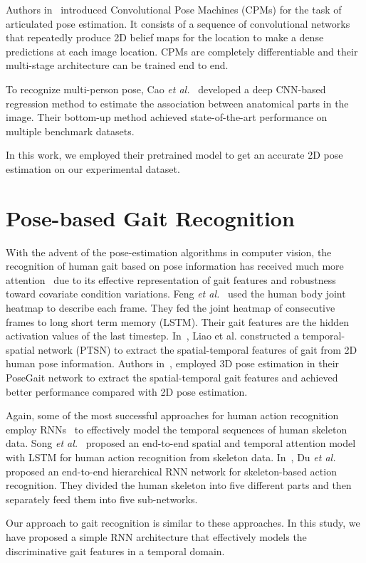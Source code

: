 Authors in~\cite{Wei_16} introduced Convolutional Pose Machines (CPMs) for the task of articulated pose estimation. It consists of a sequence of convolutional networks that repeatedly produce 2D belief maps for the location to make a dense predictions at each image location. CPMs are completely differentiable and their multi-stage architecture can be trained end to end. 

To recognize multi-person pose, Cao \textit{et al.}~\cite{Cao_19} developed a deep CNN-based regression method to estimate the association between anatomical parts in the image. Their bottom-up method achieved state-of-the-art performance on multiple benchmark datasets. 

In this work, we employed their pretrained model to get an accurate 2D pose estimation on our experimental dataset.



\section{Pose-based Gait Recognition} \label{sec:pose_based_gait_rec}
With the advent of the pose-estimation algorithms in computer vision, the recognition of human gait based on pose information has received much more attention~\cite{Feng_16, Liao_17, Liao_19} due to its effective representation of gait features and robustness toward covariate condition variations. Feng \textit{et al.}~\cite{Feng_16} used the human body joint heatmap to describe each frame. They fed the joint heatmap of consecutive frames to long short term memory (LSTM). Their gait features are the hidden activation values of the last timestep. In~\cite{Liao_17}, Liao et al. constructed a temporal-spatial network (PTSN) to extract the spatial-temporal features of gait from 2D human pose information. Authors in~\cite{Liao_19}, employed 3D pose estimation in their PoseGait network to extract the spatial-temporal gait features and achieved better performance compared with 2D pose estimation.

Again, some of the most successful approaches for human action recognition employ RNNs~\cite{Song_17, Du_15} to effectively model the temporal sequences of human skeleton data. Song \textit{et al.}~\cite{Song_17} proposed an end-to-end spatial and temporal attention model with LSTM for human action recognition from skeleton data. In~\cite{Du_15}, Du \textit{et al.} proposed an end-to-end hierarchical RNN network for skeleton-based action recognition. They divided the human skeleton into five different parts and then separately feed them into five sub-networks. 

Our approach to gait recognition is similar to these approaches. In this study, we have proposed a simple RNN architecture that effectively models the discriminative gait features in a temporal domain. 



